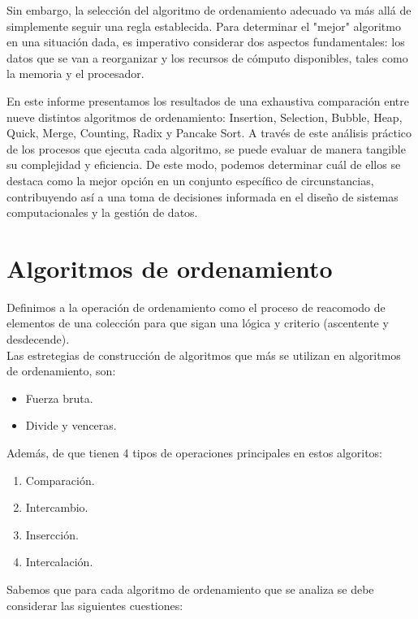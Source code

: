 \documentclass[a4paper,12pt]{article}
\begin{document}
Sin embargo, la selección del algoritmo de ordenamiento adecuado va más allá de simplemente seguir una regla establecida. Para determinar el "mejor" algoritmo en una situación dada, es imperativo considerar dos aspectos fundamentales: los datos que se van a reorganizar y los recursos de cómputo disponibles, tales como la memoria y el procesador.

En este informe presentamos los resultados de una exhaustiva comparación entre nueve distintos algoritmos de ordenamiento: Insertion, Selection, Bubble, Heap, Quick, Merge, Counting, Radix y Pancake Sort. A través de este análisis práctico de los procesos que ejecuta cada algoritmo, se puede evaluar de manera tangible su complejidad y eficiencia. De este modo, podemos determinar cuál de ellos se destaca como la mejor opción en un conjunto específico de circunstancias, contribuyendo así a una toma de decisiones informada en el diseño de sistemas computacionales y la gestión de datos.


\section{Algoritmos de ordenamiento}

Definimos a la operación de ordenamiento como el proceso de reacomodo de elementos de una colección para que sigan una lógica y criterio (ascentente y desdecende).\\

Las estretegias de construcción de algoritmos que más se utilizan en algoritmos de ordenamiento, son:

\begin{itemize}
    \item Fuerza bruta.
    \item Divide y venceras.\\
\end{itemize}

Además, de que tienen 4 tipos de operaciones principales en estos algoritos:
\begin{enumerate}
    \item Comparación.
    \item Intercambio.
    \item Insercción.
    \item Intercalación.\\
\end{enumerate}

Sabemos que para cada algoritmo de ordenamiento que se analiza se debe considerar las siguientes cuestiones:
\end{document}
